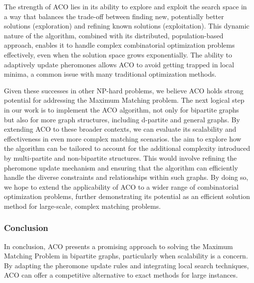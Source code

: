 The strength of ACO lies in its ability to explore and exploit the search space in a way that balances the trade-off between finding new, potentially better solutions (exploration) and refining known solutions (exploitation). This dynamic nature of the algorithm, combined with its distributed, population-based approach, enables it to handle complex combinatorial optimization problems effectively, even when the solution space grows exponentially. The ability to adaptively update pheromones allows ACO to avoid getting trapped in local minima, a common issue with many traditional optimization methods.

Given these successes in other NP-hard problems, we believe ACO holds strong potential for addressing the Maximum Matching problem. The next logical step in our work is to implement the ACO algorithm, not only for bipartite graphs but also for more graph structures, including d-partite and general graphs. By extending ACO to these broader contexts, we can evaluate its scalability and effectiveness in even more complex matching scenarios. the aim to explore how the algorithm can be tailored to account for the additional complexity introduced by multi-partite and non-bipartite structures. This would involve refining the pheromone update mechanism and ensuring that the algorithm can efficiently handle the diverse constraints and relationships within such graphs. By doing so, we hope to extend the applicability of ACO to a wider range of combinatorial optimization problems, further demonstrating its potential as an efficient solution method for large-scale, complex matching problems.


\subsubsection*{Conclusion}
In conclusion, ACO presents a promising approach to solving the Maximum Matching Problem in bipartite graphs, particularly when scalability is a concern. By adapting the pheromone update rules and integrating local search techniques, ACO can offer a competitive alternative to exact methods for large instances.


